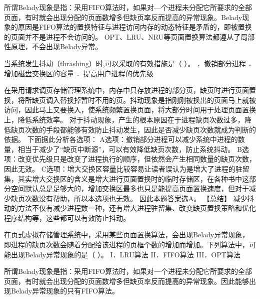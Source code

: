 \par{}
\begin{solution}所谓Belady现象是指：采用FIFO算法时，如果对---个进程未分配它所要求的全部页面，有时就会出现分配的页面数增多但缺页率反而提高的异常现象。Belady现象的原因是FIFO算法的置换特征与进程访问内存的动态特征是矛盾的，即被置换的页面并不是进程不会访问的。
OPT、LRU、NRU等页面置换算法都遵从了局部性原理，不会出现Belady异常。
\end{solution}
\question 当系统发生抖动（thrashing）时,可以采取的有效措施是（ ）。
．撤销部分进程 ．增加磁盘交换区的容量 ．提高用户进程的优先级
\par{}
\begin{solution}在采用请求调页存储管理系统中，内存中只存放进程的部分页，缺页时进行页面置换，将所缺页调入替换掉暂时不用的页。抖动现象是指刚刚被换出的页面马上就被访问，因此马上又要换入，使系统频繁置换页面，将大部分时间用于处理页面置换上，降低系统效率。
对于抖动现象，产生的根本原因在于进程缺页次数过多，降低缺页次数的手段都能够有效防止抖动发生，因此是否减少缺页次数就成为判断的依据。
下面据此分析各选项：
A选项：撤销部分进程可以减少系统中进程的数量，相当于减少了``缺页中断源''，可以有效降低缺页次数，防止系统抖动。
B选项：改变优先级只是改变了进程执行的顺序，但依然会产生相同数量的缺页次数，因此无效。
C选项：增大交换区容量比较容易让读者误认为是增大了进程的驻留集，其实增大交换区的含义是增大进行页面置换时的临时存储区，在各种书中这部分空间默认总是足够大的，增加交换区最多也只是能提高页面置换速度，但对于减少缺页次数没有帮助，所以本选项也无效。
因此本题答案选A。 【总结】
减少抖动的方法不仅有减少进程数一种，还有增大进程驻留集、改变缺页置换策略和优化程序结构等，这些都可以有效防止抖动。
\end{solution}
\question 在页式虚拟存储管理系统中，采用某些页面置换算法，会出现Belady异常现象，即进程的缺页次数会随着分配给该进程的页框个数的增加而增加。下列算法中，可能出现Belady异常现象的是（
）。 I．LRU算法 II．FIFO算法 III．OPT算法
\par{}
\begin{solution}所谓Belady现象是指：采用FIFO算法时，如果对一个进程未分配它所要求的全部页面，有时就会出现分配的页面数增多但缺页率反而提高的异常现象。因此能够出现Belady异常现象的只有FIFO算法。
\end{solution}
